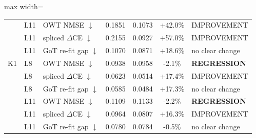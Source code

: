 \begin{table}[t]
\begin{adjustbox}{max width=\linewidth}
\begin{tabular}{lllcccl}
 & L11 & OWT NMSE $\downarrow$ & 0.1851 & 0.1073 & +42.0\% & IMPROVEMENT \\
 & L11 & spliced $\Delta$CE $\downarrow$ & 0.2155 & 0.0927 & +57.0\% & IMPROVEMENT \\
 & L11 & GoT re-fit gap $\downarrow$ & 0.1070 & 0.0871 & +18.6\% & no clear change \\
\midrule
K1 & L8 & OWT NMSE $\downarrow$ & 0.0938 & 0.0958 & -2.1\% & \textbf{REGRESSION} \\
 & L8 & spliced $\Delta$CE $\downarrow$ & 0.0623 & 0.0514 & +17.4\% & IMPROVEMENT \\
 & L8 & GoT re-fit gap $\downarrow$ & 0.0585 & 0.0484 & +17.3\% & no clear change \\
 & L11 & OWT NMSE $\downarrow$ & 0.1109 & 0.1133 & -2.2\% & \textbf{REGRESSION} \\
 & L11 & spliced $\Delta$CE $\downarrow$ & 0.0964 & 0.0807 & +16.3\% & IMPROVEMENT \\
 & L11 & GoT re-fit gap $\downarrow$ & 0.0780 & 0.0784 & -0.5\% & no clear change \\
\bottomrule
\end{tabular}
\end{adjustbox}
\end{table}
